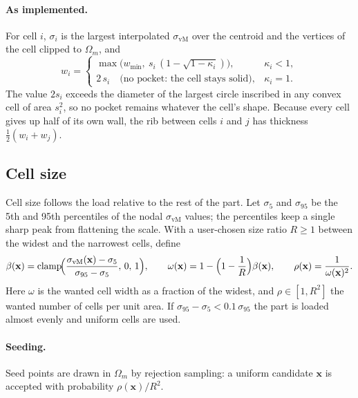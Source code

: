 \documentclass[11pt,a4paper]{article}
\newcommand{\vect}[1]{\mathbf{#1}}
\newcommand{\vm}{\sigma_{\mathrm{vM}}}
\begin{document}
\paragraph{As implemented.} For cell $i$, $\sigma_i$ is the largest
interpolated $\vm$ over the centroid and the vertices of the cell clipped to
$\Omega_m$, and
\begin{equation}
  w_i =
  \begin{cases}
    \max\bigl(w_{\min},\ s_i\,(1-\sqrt{1-\kappa_i})\bigr), & \kappa_i<1,\\[3pt]
    2\,s_i \quad\text{(no pocket: the cell stays solid)}, & \kappa_i = 1 .
  \end{cases}
\end{equation}
The value $2s_i$ exceeds the diameter of the largest circle inscribed in any
convex cell of area $s_i^2$, so no pocket remains whatever the cell's shape.
Because every cell gives up half of its own wall, the rib between cells $i$
and $j$ has thickness $\tfrac12(w_i+w_j)$.

\subsection{Cell size}

Cell size follows the load relative to the rest of the part. Let
$\sigma_{5}$ and $\sigma_{95}$ be the 5th and 95th percentiles of the nodal
$\vm$ values; the percentiles keep a single sharp peak from flattening the
scale. With a user-chosen size ratio $R\ge1$ between the widest and the
narrowest cells, define
\begin{equation}
  \beta(\vect{x}) = \operatorname{clamp}\!\Bigl(
      \frac{\vm(\vect{x})-\sigma_{5}}{\sigma_{95}-\sigma_{5}},\,0,\,1\Bigr),
  \qquad
  \omega(\vect{x}) = 1-\Bigl(1-\frac1R\Bigr)\beta(\vect{x}),
  \qquad
  \rho(\vect{x}) = \frac{1}{\omega(\vect{x})^2}.
  \label{eq:density}
\end{equation}
Here $\omega$ is the wanted cell width as a fraction of the widest, and
$\rho\in[1,R^2]$ the wanted number of cells per unit area. If
$\sigma_{95}-\sigma_{5} < 0.1\,\sigma_{95}$ the part is loaded almost evenly
and uniform cells are used.

\paragraph{Seeding.} Seed points are drawn in $\Omega_m$ by rejection
sampling: a uniform candidate $\vect{x}$ is accepted with probability
$\rho(\vect{x})/R^2$.
\end{document}
